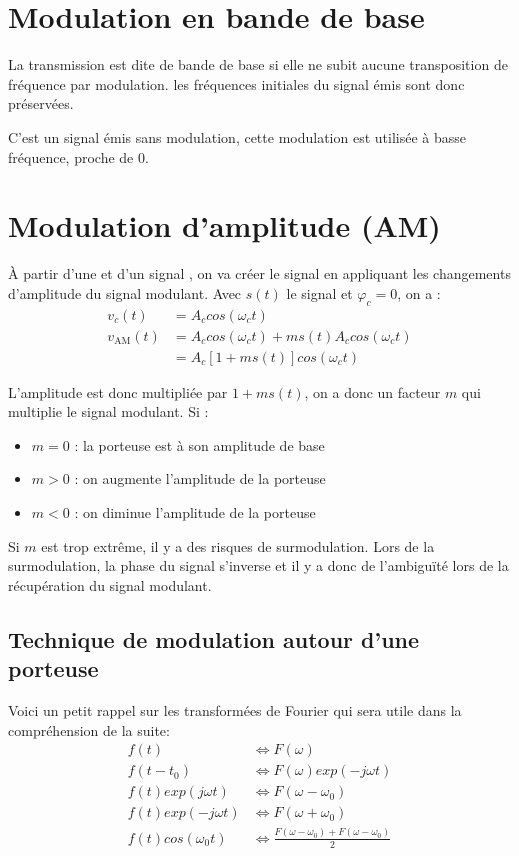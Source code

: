 \section{Modulation en bande de base}

La transmission est dite de bande de base si elle ne subit aucune transposition de fréquence par modulation. les fréquences initiales du signal émis sont donc préservées.

C'est un signal émis sans modulation, cette modulation est utilisée à basse fréquence, proche de 0.

\section{Modulation d'amplitude (AM)}

À partir d'une  et d'un signal , on va créer le signal  en appliquant les changements d'amplitude du signal modulant. Avec $s(t)$ le signal et $\varphi_c = 0$, on a :
\begin{align*}
v_c(t) &= A_c cos(\omega_c t)\\
v_{\text{AM}}(t) &= A_c cos(\omega_c t) + ms(t)A_c cos(\omega_c t)\\
	&= A_c[1 + ms(t)]cos(\omega_c t)
\end{align*}

L'amplitude est donc multipliée par $1+ms(t)$, on a donc un facteur $m$ qui multiplie le signal modulant. Si :
\begin{itemize}
\item $m = 0$ : la porteuse est à son amplitude de base
\item $m > 0$ : on augmente l'amplitude de la porteuse
\item $m < 0$ : on diminue l'amplitude de la porteuse
\end{itemize}
Si $m$ est trop extrême, il y a des risques de surmodulation. Lors de la surmodulation, la phase du signal s'inverse et il y a donc de l’ambiguïté lors de la récupération du signal modulant.

\newpage
\subsection{Technique de modulation autour d'une porteuse}

Voici un petit rappel sur les transformées de Fourier qui sera utile dans la compréhension de la suite:
\begin{align*}
f(t) &\Leftrightarrow F(\omega)\\
f(t-t_0) &\Leftrightarrow F(\omega)exp(-j\omega t)\\
f(t) exp(j\omega t) &\Leftrightarrow F(\omega-\omega_0)\\
f(t) exp(-j\omega t)&\Leftrightarrow F(\omega+\omega_0)\\
f(t) cos(\omega_0 t) &\Leftrightarrow \frac{F(\omega-\omega_0) +F(\omega-\omega_0)}{2}
\end{align*}

